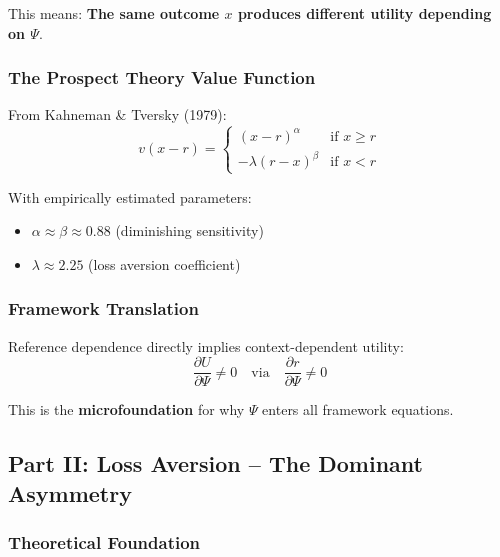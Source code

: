 This means: \textbf{The same outcome $x$ produces different utility depending on $\Psi$}.

\subsubsection{The Prospect Theory Value Function}

From Kahneman \& Tversky (1979):
\begin{equation}
v(x - r) = 
\begin{cases}
(x - r)^\alpha & \text{if } x \geq r \\
-\lambda (r - x)^\beta & \text{if } x < r
\end{cases}
\label{eq:kt-value}
\end{equation}

With empirically estimated parameters:
\begin{itemize}
    \item $\alpha \approx \beta \approx 0.88$ (diminishing sensitivity)
    \item $\lambda \approx 2.25$ (loss aversion coefficient)
\end{itemize}

\subsubsection{Framework Translation}

Reference dependence directly implies context-dependent utility:
\begin{equation}
\frac{\partial U}{\partial \Psi} \neq 0 \quad \text{via} \quad \frac{\partial r}{\partial \Psi} \neq 0
\end{equation}

This is the \textbf{microfoundation} for why $\Psi$ enters all framework equations.

\subsection{Part II: Loss Aversion – The Dominant Asymmetry}

\subsubsection{Theoretical Foundation}

